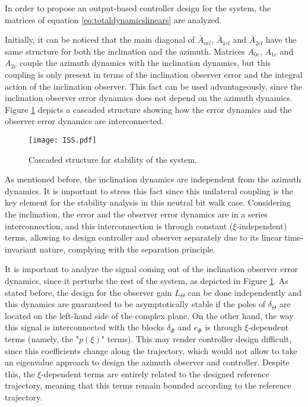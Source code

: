 \documentclass[main.tex]{subfiles}
\begin{document}
	


In order to propose an output-based controller design for the system, the matrices of equation \eqref{eq:totaldynamicslinears} are analyzed. 

Initially, it can be noticed that the main diagonal of $\bar{A}_{ocl}$, $\bar{A}_{1cl}$ and $\bar{A}_{2cl}$ have the same structure for both the inclination and the azimuth. Matrices $A_{0c}$, $A_{1c}$ and $A_{2c}$ couple the azimuth dynamics with the inclination dynamics, but this coupling is only present in terms of the inclination observer error and the integral action of the inclination observer. This fact can be used advantageously, since the inclination observer error dynamics does not depend on the azimuth dynamics. Figure \ref{fig:ISS} depicts a cascaded structure showing how the error dynamics and the observer error dynamics are interconnected.

\begin{figure}[h]\centering
	\texttt{[image: ISS.pdf]}
	\caption{Cascaded structure for stability of the system.
		\label{fig:ISS} }
\end{figure}

As mentioned before, the inclination dynamics are independent from the azimuth dynamics. It is important to stress this fact since this unilateral coupling is the key element for the stability analysis in this neutral bit walk case. Considering the inclination, the error and the observer error dynamics are in a series interconnection, and this interconnection is through constant ($\xi$-independent) terms, allowing to design controller and observer separately due to its linear time-invariant nature, complying with the separation principle. 

It is important to analyze the signal coming out of the inclination observer error dynamics, since it perturbs the rest of the system, as depicted in Figure \ref{fig:ISS}. As stated before, the design for the observer gain $L_\Theta$ can be done independently and this dynamics are guaranteed to be asymptotically stable if the poles of $\delta_\Theta$ are located on the left-hand side of the complex plane. On the other hand, the way this signal is interconnected with the blocks $\delta_\Phi$ and $e_\Phi$ is through $\xi$-dependent terms (namely, the "$p(\xi)$" terms). This may render controller design difficult, since this coefficients change along the trajectory, which would not allow to take an eigenvalue approach to design the azimuth observer and controller. Despite this, the $\xi$-dependent terms are entirely related to the designed reference trajectory, meaning that this terms remain bounded according to the reference trajectory. 
\end{document}
